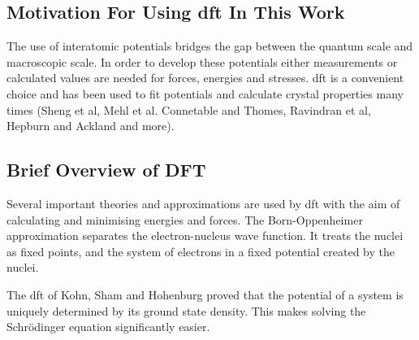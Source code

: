 \FloatBarrier
\subsection{Motivation For Using \acrshort{dft} In This Work}

The use of interatomic potentials bridges the gap between the quantum scale and macroscopic scale.  In order to develop these potentials either measurements or calculated values are needed for forces, energies and stresses.  \acrshort{dft} is a convenient choice and has been used to fit potentials and calculate crystal properties many times (Sheng et al\cite{shengeam}, Mehl et al.\cite{mehlsp} Connetable and Thomes,\cite{orthonisi} Ravindran et al\cite{dftrfkj}, Hepburn and Ackland\cite{hepburnfec} and more).


\FloatBarrier
\subsection{Brief Overview of DFT}

Several important theories and approximations are used by \acrshort{dft} with the aim of calculating and minimising energies and forces.  The Born-Oppenheimer approximation separates the electron-nucleus wave function.  It treats the nuclei as fixed points, and the system of electrons in a fixed potential created by the nuclei.


The \acrshort{dft} of Kohn, Sham and Hohenburg proved that the potential of a system is uniquely determined by its ground state density.  This makes solving the Schr\"{o}dinger equation significantly easier.

